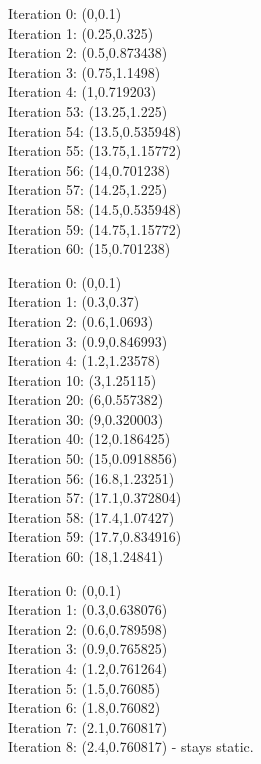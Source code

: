 \documentclass[11pt]{article}
\begin{document}
    \begin{solution}
        Iteration 0: (0,0.1)\\
        Iteration 1: (0.25,0.325)\\
        Iteration 2: (0.5,0.873438)\\
        Iteration 3: (0.75,1.1498)\\
        Iteration 4: (1,0.719203)\\
        Iteration 53: (13.25,1.225)\\
        Iteration 54: (13.5,0.535948)\\
        Iteration 55: (13.75,1.15772)\\
        Iteration 56: (14,0.701238)\\
        Iteration 57: (14.25,1.225)\\
        Iteration 58: (14.5,0.535948)\\
        Iteration 59: (14.75,1.15772)\\
        Iteration 60: (15,0.701238)
    \end{solution}
    \begin{solution}[Answer 2c-iv]
        Iteration 0: (0,0.1)\\
        Iteration 1: (0.3,0.37)\\
        Iteration 2: (0.6,1.0693)\\
        Iteration 3: (0.9,0.846993)\\
        Iteration 4: (1.2,1.23578)\\
        Iteration 10: (3,1.25115)\\
        Iteration 20: (6,0.557382)\\
        Iteration 30: (9,0.320003)\\
        Iteration 40: (12,0.186425)\\
        Iteration 50: (15,0.0918856)\\
        Iteration 56: (16.8,1.23251)\\
        Iteration 57: (17.1,0.372804)\\
        Iteration 58: (17.4,1.07427)\\
        Iteration 59: (17.7,0.834916)\\
        Iteration 60: (18,1.24841)
    \end{solution}
    \newpage
    \begin{solution}[Answer 2d-i]
        Iteration 0: (0,0.1)\\
        Iteration 1: (0.3,0.638076)\\
        Iteration 2: (0.6,0.789598)\\
        Iteration 3: (0.9,0.765825)\\
        Iteration 4: (1.2,0.761264)\\
        Iteration 5: (1.5,0.76085)\\
        Iteration 6: (1.8,0.76082)\\
        Iteration 7: (2.1,0.760817)\\
        Iteration 8: (2.4,0.760817) - stays static.
    \end{solution}
\end{document}
